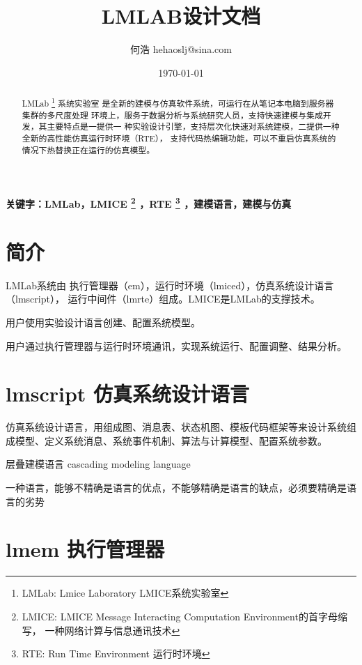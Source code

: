 \documentclass[UTF8, 10pt, a4paper]{ctexart}
\title{LMLAB设计文档}
\author{何浩 hehaoslj@sina.com}
\date{\today}
\begin{document}
\maketitle

\begin{abstract}

LMLab \footnote{LMLab: Lmice Laboratory LMICE系统实验室} 系统实验室
是全新的建模与仿真软件系统，可运行在从笔记本电脑到服务器集群的多尺度处理
环境上，服务于数据分析与系统研究人员，支持快速建模与集成开发，其主要特点是一提供一
种实验设计引擎，支持层次化快速对系统建模，二提供一种全新的高性能仿真运行时环境（RTE），
支持代码热编辑功能，可以不重启仿真系统的情况下热替换正在运行的仿真模型。

\end{abstract}

\textbf{\normalsize 关键字：LMLab，LMICE \footnote{LMICE: LMICE Message Interacting Computation Environment的首字母缩写，
一种网络计算与信息通讯技术}
，RTE \footnote{RTE: Run Time Environment 运行时环境}
，建模语言，建模与仿真}


\tableofcontents

\section {简介}


LMLab系统由 执行管理器（em），运行时环境（lmiced），仿真系统设计语言（lmscript），
运行中间件（lmrte）组成。LMICE是LMLab的支撑技术。

用户使用实验设计语言创建、配置系统模型。

用户通过执行管理器与运行时环境通讯，实现系统运行、配置调整、结果分析。

\section{lmscript 仿真系统设计语言}

仿真系统设计语言，用组成图、消息表、状态机图、模板代码框架等来设计系统组成模型、定义系统消息、系统事件机制、算法与计算模型、配置系统参数。

层叠建模语言 cascading modeling language

一种语言，能够不精确是语言的优点，不能够精确是语言的缺点，必须要精确是语言的劣势

\section{lmem 执行管理器}
\end{document}
